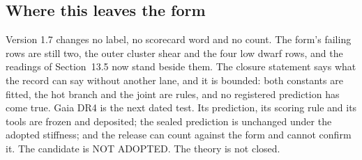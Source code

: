\documentclass[10pt]{article}
\begin{document}
\subsection{Where this leaves the form}
Version 1.7 changes no label, no scorecard word and no count. The form's failing rows are still two, the outer cluster shear and the four low dwarf rows, and the readings of Section~13.5 now stand beside them. The closure statement says what the record can say without another lane, and it is bounded: both constants are fitted, the hot branch and the joint are rules, and no registered prediction has come true. Gaia DR4 is the next dated test. Its prediction, its scoring rule and its tools are frozen and deposited; the sealed prediction is unchanged under the adopted stiffness; and the release can count against the form and cannot confirm it. The candidate is NOT ADOPTED. The theory is not closed.
\end{document}
